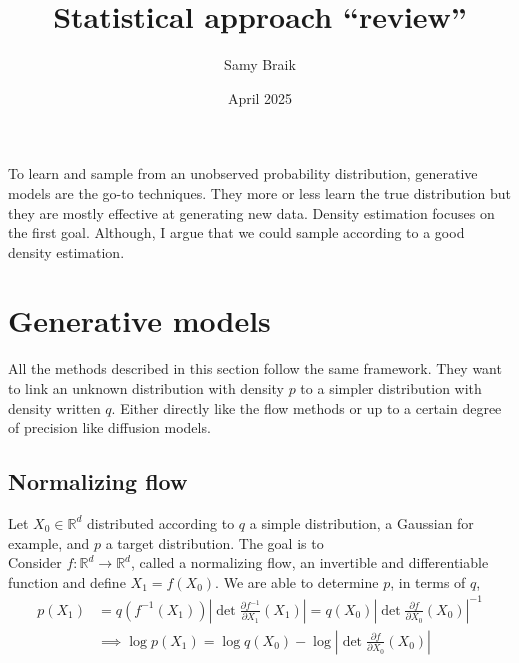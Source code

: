 \documentclass{article}
\title{Statistical approach ``review''}
\author{Samy Braik}
\date{April 2025}
\begin{document}
\maketitle
To learn and sample from an unobserved probability distribution, generative models are the go-to techniques. They more or less learn the true distribution but they are mostly effective at generating new data. Density estimation focuses on the first goal. Although, I argue that we could sample according to a good density estimation.      

\section{Generative models}
All the methods described in this section follow the same framework. They want to link an unknown distribution with density \(p\) to a simpler distribution with density written \(q\). Either directly like the flow methods or up to a certain degree of precision like diffusion models.
\subsection{Normalizing flow}
Let $X_0\in\mathbb{R}^d$ distributed according to $q$ a simple distribution, a Gaussian for example, and $p$ a target distribution.  The goal is to 
\\
Consider $f:\mathbb{R}^d\rightarrow\mathbb{R}^d$, called a normalizing flow, an invertible and differentiable function and define $X_1=f(X_0)$. 
We are able to determine \(p\), in terms of \(q\), 
\begin{align}
    p(X_1)&=q(f^{-1}(X_1))\left| \det\frac{\partial f^{-1}}{\partial X_1}(X_1) \right| = q(X_0)\left| \det \frac{\partial f}{\partial X_0}(X_0) \right|^{-1} \\
    &\implies \log p(X_1)=\log q(X_0) - \log \left|  \det \frac{\partial f}{\partial X_0}(X_0) \right|  
\end{align}
\end{document}

